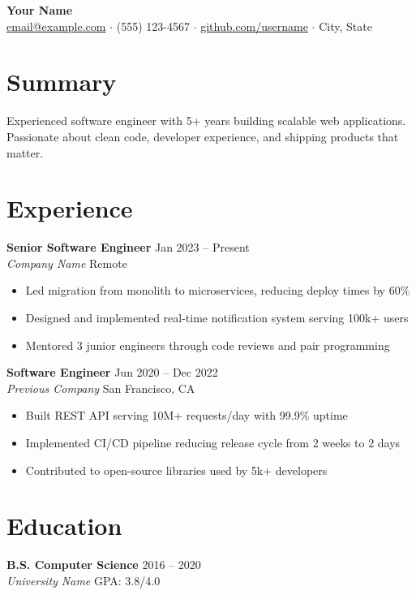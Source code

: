 \documentclass[11pt,a4paper]{article}
\begin{document}
\begin{center}
  {\LARGE\bfseries\color{primary} Your Name}\\[4pt]
  \href{mailto:email@example.com}{email@example.com} $\cdot$
  (555) 123-4567 $\cdot$
  \href{https://github.com/username}{github.com/username} $\cdot$
  City, State
\end{center}

\section{Summary}
Experienced software engineer with 5+ years building scalable web applications. Passionate about clean code, developer experience, and shipping products that matter.

\section{Experience}

\textbf{Senior Software Engineer} \hfill Jan 2023 -- Present\\
\textit{Company Name} \hfill Remote
\begin{itemize}[nosep, leftmargin=*]
  \item Led migration from monolith to microservices, reducing deploy times by 60\%
  \item Designed and implemented real-time notification system serving 100k+ users
  \item Mentored 3 junior engineers through code reviews and pair programming
\end{itemize}

\textbf{Software Engineer} \hfill Jun 2020 -- Dec 2022\\
\textit{Previous Company} \hfill San Francisco, CA
\begin{itemize}[nosep, leftmargin=*]
  \item Built REST API serving 10M+ requests/day with 99.9\% uptime
  \item Implemented CI/CD pipeline reducing release cycle from 2 weeks to 2 days
  \item Contributed to open-source libraries used by 5k+ developers
\end{itemize}

\section{Education}

\textbf{B.S. Computer Science} \hfill 2016 -- 2020\\
\textit{University Name} \hfill GPA: 3.8/4.0
\end{document}
